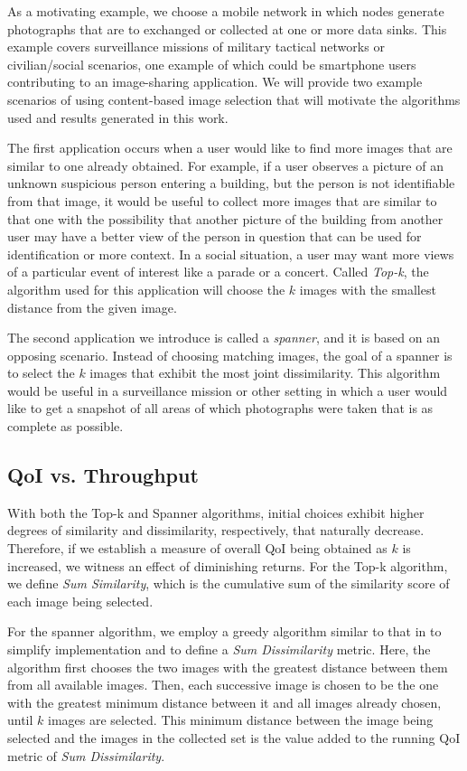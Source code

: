 As a motivating example, we choose a mobile network in which nodes generate photographs that are to exchanged or collected at one or more data sinks.  This example covers surveillance missions of military tactical networks or civilian/social scenarios, one example of which could be smartphone users contributing to an image-sharing application.  We will provide two example scenarios of using content-based image selection that will motivate the algorithms used and results generated in this work.

The first application occurs when a user would like to find more images that are similar to one already obtained.  For example, if a user observes a picture of an unknown suspicious person entering a building, but the person is not identifiable from that image, it would be useful to collect more images that are similar to that one with the possibility that another picture of the building from another user may have a better view of the person in question that can be used for identification or more context.  In a social situation, a user may want more views of a particular event of interest like a parade or a concert.  Called \emph{Top-k}, the algorithm used for this application will choose the $k$ images with the smallest distance from the given image. 

The second application we introduce is called a \emph{spanner}, and it is based on an opposing scenario.  Instead of  choosing matching images, the goal of a spanner is to select the $k$ images that exhibit the most joint dissimilarity.  This algorithm would be useful in a surveillance mission or other setting in which a user would like to get a snapshot of all areas of which photographs were taken that is as complete as possible.  

\subsection{QoI vs. Throughput}

With both the Top-k and Spanner algorithms, initial choices exhibit higher degrees of similarity and dissimilarity, respectively, that naturally decrease.  Therefore, if we establish a measure of overall QoI being obtained as $k$ is increased, we witness an effect of diminishing returns.  For the Top-k algorithm, we define \emph{Sum Similarity}, which is the cumulative sum of the similarity score of each image being selected.  

For the spanner algorithm, we employ a greedy algorithm similar to that in \cite{mediascope} to simplify implementation and to define a \emph{Sum Dissimilarity} metric.  Here, the algorithm first chooses the two images with the greatest distance between them from all available images.  Then, each successive image is chosen to be the one with the greatest minimum distance between it and all images already chosen, until $k$ images are selected.  This minimum distance between the image being selected and the images in the collected set is the value added to the running QoI metric of \emph{Sum Dissimilarity}.

